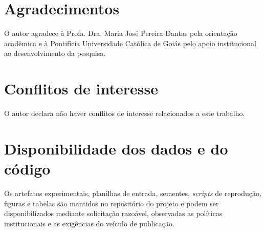 \section*{Agradecimentos}

\noindent O autor agradece à Profa. Dra. Maria José Pereira Dantas pela orientação acadêmica e à Pontifícia Universidade Católica de Goiás pelo apoio institucional ao desenvolvimento da pesquisa.

\section*{Conflitos de interesse}

\noindent O autor declara não haver conflitos de interesse relacionados a este trabalho.

\section*{Disponibilidade dos dados e do código}

\noindent Os artefatos experimentais, planilhas de entrada, sementes, \textit{scripts} de reprodução, figuras e tabelas são mantidos no repositório do projeto e podem ser disponibilizados mediante solicitação razoável, observadas as políticas institucionais e as exigências do veículo de publicação.
